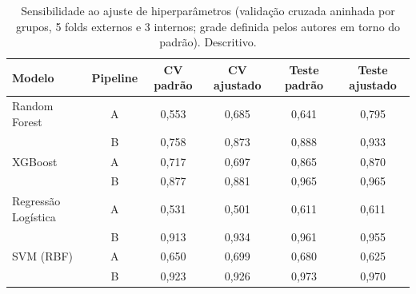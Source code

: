 \begin{table}[htbp]
  \centering
  \caption{Sensibilidade ao ajuste de hiperparâmetros (validação cruzada aninhada por grupos, 5 folds externos e 3 internos; grade definida pelos autores em torno do padrão). Descritivo.}
  \label{tab:sens_ajuste}
  \begin{tabular}{lccccc}
    \toprule
    Modelo & Pipeline & CV padrão & CV ajustado & Teste padrão & Teste ajustado \\
    \midrule
    Random Forest & A & 0,553 & 0,685 & 0,641 & 0,795 \\
     & B & 0,758 & 0,873 & 0,888 & 0,933 \\
    XGBoost & A & 0,717 & 0,697 & 0,865 & 0,870 \\
     & B & 0,877 & 0,881 & 0,965 & 0,965 \\
    Regressão Logística & A & 0,531 & 0,501 & 0,611 & 0,611 \\
     & B & 0,913 & 0,934 & 0,961 & 0,955 \\
    SVM (RBF) & A & 0,650 & 0,699 & 0,680 & 0,625 \\
     & B & 0,923 & 0,926 & 0,973 & 0,970 \\
    \bottomrule
  \end{tabular}
\end{table}
